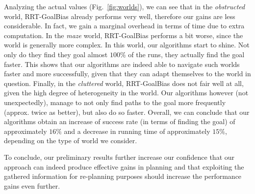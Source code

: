 \documentclass[10pt,twoside,twocolumn]{article}
\begin{document}
Analyzing the actual values (Fig.~\ref{fig:worlds}), we can see that in the \emph{obstructed}
world, RRT-GoalBias already performs very well, therefore our gains
are less considerable. In fact, we gain a marginal overhead in terms
of time due to extra computation. In the \emph{maze} world,
RRT-GoalBias performs a bit worse, since the world is generally more
complex. In this world, our algorithms start to shine. Not only do
they find they goal almost $100\%$ of the runs, they actually find the
goal faster. This shows that our algorithms are indeed able to
navigate such worlds faster and more successfully, given that they can
adapt themselves to the world in question.
Finally, in the \emph{cluttered} world, RRT-GoalBias does not fair
well at all, given the high degree of heterogeneity in the world. Our
algorithms however (not unexpectedly), 
manage to not only find paths to the goal more frequently
(approx. twice as better), but also do so faster. 
Overall, we can conclude that our algorithms obtain an increase
of success rate (in terms of finding the goal) of approximately
$16\%$ and a decrease in running time of approximately $15\%$,
depending on the type of world we consider.

To conclude, our preliminary results further increase our confidence that our approach can indeed produce effective gains in
planning and that exploiting the gathered information for re-planning purposes should increase the performance gains
even further.
\end{document}
